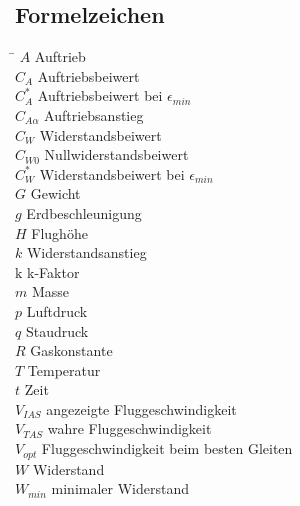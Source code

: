 \subsection*{Formelzeichen}
\begin{tabbing}
\hspace*{2cm}\=\kill
$A$ \> Auftrieb \\[0.2ex]
$C_A$ \> Auftriebsbeiwert \\[0.2ex]
$C_A^*$ \> Auftriebsbeiwert bei $\epsilon_{min}$ \\[0.2ex]
$C_{A \alpha}$ \> Auftriebsanstieg \\[0.2ex]
$C_W$ \> Widerstandsbeiwert \\[0.2ex]
$C_{W0}$ \> Nullwiderstandsbeiwert \\[0.2ex]
$C_W^*$ \> Widerstandsbeiwert bei $\epsilon_{min}$ \\[0.2ex]
$G$ \> Gewicht \\[0.2ex]
$g$ \> Erdbeschleunigung \\[0.2ex]
$H$ \> Flughöhe \\[0.2ex]
$k$ \> Widerstandsanstieg \\[0.2ex]
$\mathrm{k}$ \> k-Faktor \\[0.2ex]
$m$ \> Masse \\[0.2ex]
$p$ \> Luftdruck \\[0.2ex]
$q$ \> Staudruck \\[0.2ex]
$R$ \> Gaskonstante \\[0.2ex]
$T$ \> Temperatur \\[0.2ex]
$t$ \> Zeit \\[0.2ex]
$V_{IAS}$ \> angezeigte Fluggeschwindigkeit \\[0.2ex]
$V_{TAS}$ \> wahre Fluggeschwindigkeit \\[0.2ex]
$V_{opt}$ \> Fluggeschwindigkeit beim besten Gleiten \\[0.2ex]
$W$ \> Widerstand \\[0.2ex]
$W_{min}$ \> minimaler Widerstand \\[0.2ex]
\end{tabbing}
